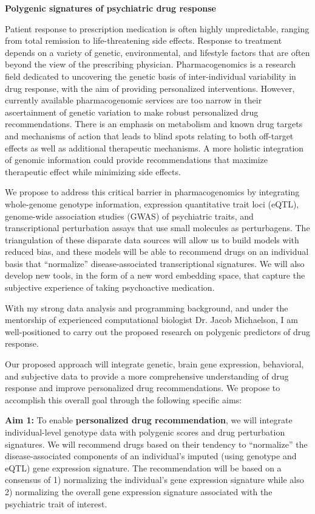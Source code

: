 \documentclass[
]{article}
\author{}
\date{}
\begin{document}
\textbf{Polygenic signatures of psychiatric drug response{~}}

Patient response to prescription medication is often highly
unpredictable, ranging from total remission to life-threatening side
effects. Response to treatment depends on a variety of genetic,
environmental, and lifestyle factors that are often beyond the view of
the prescribing physician. Pharmacogenomics is a research field
dedicated to uncovering the genetic basis of inter-individual
variability in drug response, with the aim of providing personalized
interventions. However, currently available pharmacogenomic services are
too narrow in their ascertainment of genetic variation to make robust
personalized drug recommendations. There is an emphasis on metabolism
and known drug targets and mechanisms of action that leads to blind
spots relating to both off-target effects as well as additional
therapeutic mechanisms. A more holistic integration of genomic
information could provide recommendations that maximize therapeutic
effect while minimizing side effects.{~}

We propose to address this critical barrier in pharmacogenomics by
integrating whole-genome genotype information, expression quantitative
trait loci (eQTL), genome-wide association studies (GWAS) of psychiatric
traits, and transcriptional perturbation assays that use small molecules
as perturbagens. The triangulation of these disparate data sources will
allow us to build models with reduced bias, and these models will be
able to recommend drugs on an individual basis that ``normalize''
disease-associated transcriptional signatures. We will also develop new
tools, in the form of a new word embedding space, that capture the
subjective experience of taking psychoactive medication.{~}

With my strong data analysis and programming background, and under the
mentorship of experienced computational biologist Dr. Jacob Michaelson,
I am well-positioned to carry out the proposed research on polygenic
predictors of drug response.{~}

Our proposed approach will integrate genetic, brain gene expression,
behavioral, and subjective data to provide a more comprehensive
understanding of drug response and improve personalized drug
recommendations. We propose to accomplish this overall goal through the
following specific aims:{~}

\textbf{Aim 1:} To enable \textbf{personalized drug recommendation}, we
will integrate individual-level genotype data with polygenic scores and
drug perturbation signatures. We will recommend drugs based on their
tendency to ``normalize'' the disease-associated components of an
individual's imputed (using genotype and eQTL) gene expression
signature. The recommendation will be based on a consensus of 1)
normalizing the individual's gene expression signature while also 2)
normalizing the overall gene expression signature associated with the
psychiatric trait of interest.{~}
\end{document}
